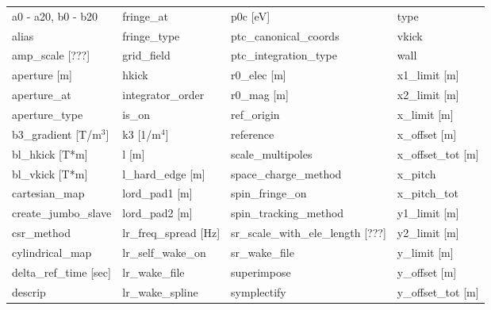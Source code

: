  \begin{tabular}{llll} \toprule
a0 - a20, b0 - b20             & fringe_at                      & p0c [eV]                       & type                           \\
alias                          & fringe_type                    & ptc_canonical_coords           & vkick                          \\
amp_scale [???]                & grid_field                     & ptc_integration_type           & wall                           \\
aperture [m]                   & hkick                          & r0_elec [m]                    & x1_limit [m]                   \\
aperture_at                    & integrator_order               & r0_mag [m]                     & x2_limit [m]                   \\
aperture_type                  & is_on                          & ref_origin                     & x_limit [m]                    \\
b3_gradient [T/m$^3$]          & k3 [1/m$^4$]                   & reference                      & x_offset [m]                   \\
bl_hkick [T*m]                 & l [m]                          & scale_multipoles               & x_offset_tot [m]               \\
bl_vkick [T*m]                 & l_hard_edge [m]                & space_charge_method            & x_pitch                        \\
cartesian_map                  & lord_pad1 [m]                  & spin_fringe_on                 & x_pitch_tot                    \\
create_jumbo_slave             & lord_pad2 [m]                  & spin_tracking_method           & y1_limit [m]                   \\
csr_method                     & lr_freq_spread [Hz]            & sr_scale_with_ele_length [???] & y2_limit [m]                   \\
cylindrical_map                & lr_self_wake_on                & sr_wake_file                   & y_limit [m]                    \\
delta_ref_time [sec]           & lr_wake_file                   & superimpose                    & y_offset [m]                   \\
descrip                        & lr_wake_spline                 & symplectify                    & y_offset_tot [m]               \\

\end{tabular}
